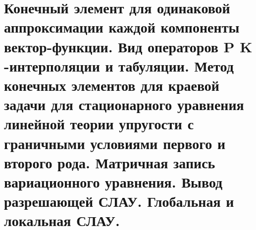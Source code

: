 \documentclass[__main__.tex]{subfiles}
\begin{document}
\section{Конечный элемент для одинаковой аппроксимации каждой компоненты вектор-функции. Вид операторов P K -интерполяции и табуляции. Метод конечных элементов для краевой задачи для стационарного уравнения линейной теории упругости с граничными условиями первого и второго рода. Матричная запись вариационного уравнения. Вывод разрешающей СЛАУ. Глобальная и локальная СЛАУ.}
\end{document}
